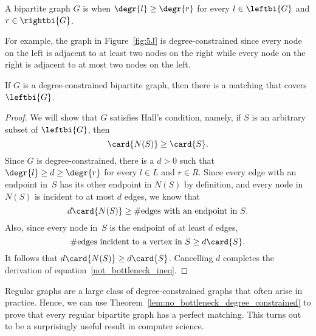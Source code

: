 \begin{definition}\label{degree-constrained_def}
  A bipartite graph $G$ is  when $\degr{l} \geq
  \degr{r}$ for every $l \in \leftbi{G}$ and $r \in \rightbi{G}$.
\end{definition}

For example, the graph in Figure~\ref{fig:5J} is degree-constrained
since every node on the left is adjacent to at least two nodes on the
right while every node on the right is adjacent to at most two nodes
on the left.

\begin{theorem}\label{lem:no_bottleneck_degree_constrained}
  If $G$ is a degree-constrained bipartite graph, then there is a matching
  that covers~$\leftbi{G}$.
\end{theorem}

\begin{proof}

\iffalse
  The proof is by contradiction.  Suppose that $G$ is degree-constrained
  but that there is no matching that covers~$\leftbi{G}$.  By
  Theorem~\ref{thm:halls}, this means that there must be a bottleneck $S
  \subseteq \leftbi{G}$.
\fi

  We will show that $G$ satisfies Hall's condition, namely, if $S$ is
  an arbitrary subset of $\leftbi{G}$, then
\begin{equation}\label{not_bottleneck_ineq}
\card{N(S)} \ge \card{S}.  
\end{equation}
  Since $G$ is degree-constrained, there is a $d>0$ such that
  $\degr{l} \ge d \ge \degr{r}$ for every $l \in L$ and $r \in R$.
  Since every edge with an endpoint in~$S$ has its other endpoint in
  $N(S)$ by definition, and every node in $N(S)$ is incident to at
  most $d$ edges, we know that
\[
d\card{N(S)} \geq \#\text{edges with an endpoint in $S$}.
\]
Also, since every node in~$S$ is the endpoint of at least $d$ edges,
\[
\#\text{edges incident to a vertex in $S$} \geq d\card{S}.
\]
It follows that $d\card{N(S)} \ge d\card{S}$.  Cancelling $d$
completes the derivation of equation~\eqref{not_bottleneck_ineq}.
\end{proof}

Regular graphs are a large class of degree-constrained graphs that
often arise in practice.  Hence, we can use
Theorem~\ref{lem:no_bottleneck_degree_constrained} to prove that every
regular bipartite graph has a perfect matching.  This turns out to be
a surprisingly useful result in computer science.

